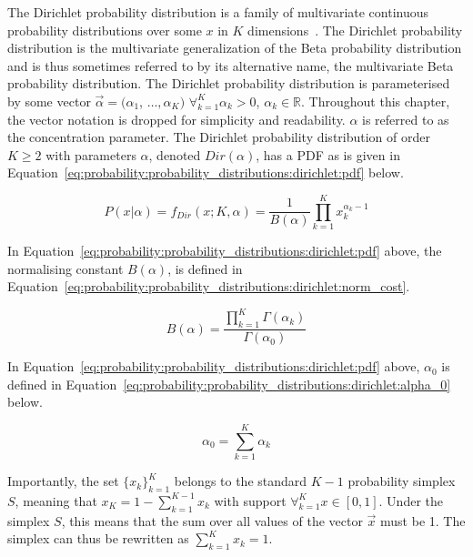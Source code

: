 The Dirichlet probability distribution is a family of multivariate continuous probability distributions over some $x$ in $K$ dimensions~\cite{ref:wackerly:2014}. The Dirichlet probability distribution is the multivariate generalization of the Beta probability distribution and is thus sometimes referred to by its alternative name, the multivariate Beta probability distribution. The Dirichlet probability distribution is parameterised by some vector $\vec{\alpha} = (\alpha_{1}$,  $\dots, \alpha_{K})$ $\forall_{k=1}^{K} \alpha_{k} > 0$, $\alpha_{k} \in \mathbb{R}$. Throughout this chapter, the vector notation is dropped for simplicity and readability. $\alpha$ is referred to as the concentration parameter. The Dirichlet probability distribution of order $K \geq 2$ with parameters $\alpha$, denoted $Dir(\alpha)$, has a \acs{PDF} as is given in Equation~\eqref{eq:probability:probability_distributions:dirichlet:pdf} below.

\begin{equation}
      \label{eq:probability:probability_distributions:dirichlet:pdf}
      P(x \vert \alpha) =  f_{Dir}(x; K, \alpha) = \frac{1}{B(\alpha)}  \prod_{k=1}^{K} x_{k}^{\alpha_{k} - 1}
\end{equation}

In Equation~\eqref{eq:probability:probability_distributions:dirichlet:pdf} above, the normalising constant $B(\alpha)$, is defined in Equation~\eqref{eq:probability:probability_distributions:dirichlet:norm_cost}.

\begin{equation}
      \label{eq:probability:probability_distributions:dirichlet:norm_cost}
      B(\alpha) = \frac{\prod_{k=1}^{K} \Gamma(\alpha_{k})}{\Gamma(\alpha_{0})}
\end{equation}

In Equation~\eqref{eq:probability:probability_distributions:dirichlet:pdf} above, $\alpha_{0}$ is defined in Equation~\eqref{eq:probability:probability_distributions:dirichlet:alpha_0} below.

\begin{equation}
      \label{eq:probability:probability_distributions:dirichlet:alpha_0}
      \alpha_{0} = \sum_{k=1}^{K}\alpha_{k}
\end{equation}

Importantly, the set $\{x_{k}\}_{k=1}^{K}$ belongs to the standard $K-1$ probability simplex $S$, meaning that $x_{K} = 1 - \sum_{k=1}^{K-1}x_{k}$ with support $\forall_{k=1}^{K} x \in [0,1]$. Under the simplex $S$, this means that the sum over all values of the vector $\vec{x}$ must be 1. The simplex can thus be rewritten as $\sum_{k=1}^{K}x_{k} = 1$.

